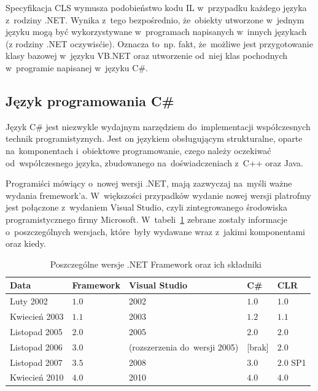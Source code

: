Specyfikacja CLS wymusza podobieństwo kodu IL w~przypadku każdego języka z~rodziny .NET. Wynika z~tego bezpośrednio, że~obiekty utworzone w~jednym języku mogą być wykorzystywane w~programach napisanych w~innych językach (z rodziny .NET oczywisćie). Oznacza to~np. fakt, że~możliwe jest przygotowanie klasy bazowej w~języku VB.NET oraz utworzenie od~niej klas pochodnych w~programie napisanej w~języku C\#.

\subsection{Język programowania C\#}
Język C\# jest niezwykle wydajnym narzędziem do~implementacji współczesnych technik programistyznych. Jest on językiem obsługującym strukturalne, oparte na~komponentach i~obiektowe programowanie, czego należy oczekiwać od~współczesnego języka, zbudowanego na~doświadczeniach z~C++ oraz Java. 

Programiści mówiący o~nowej wersji .NET, mają zazwyczaj na~myśli ważne wydania fremework'a. W~większości przypadków wydanie nowej wersji platrofmy jest połączone z~wydaniem Visual Studio, czyli zintegrowanego środowiska programistycznego firmy Microsoft. W~tabeli~\ref{dotNet:dates} zebrane zostały informacje o~poszczególnych wersjach, które~były wydawane wraz z~jakimi komponentami oraz kiedy.

\begin{table}
	\centering
	\begin{tabular}{l|l|l|l|l}
	\textbf{Data} & \textbf{Framework} & \textbf{Visual Studio} & \textbf{C\#} & \textbf{CLR} \\ \hline
	Luty 2002 & $1.0$ & 2002 & $1.0$ & $1.0$ \\ 
	Kwiecień 2003 & $1.1$ & 2003 & $1.2$ & $1.1$ \\ 
	Listopad 2005 & $2.0$ & 2005 & $2.0$ & $2.0$ \\ 
	Listopad 2006 & $3.0$ & (rozszerzenia do~wersji 2005) & [brak] & $2.0$ \\ 
	Listopad 2007 & $3.5$ & 2008 & $3.0$ & $2.0$ SP1 \\ 
	Kwiecień 2010 & $4.0$ & 2010 & $4.0$ & $4.0$ \\
	\end{tabular}
	\caption{Poszczególne wersje .NET Framework oraz ich składniki~\cite{cSharp:inDepthS}\label{dotNet:dates}}
\end{table}

